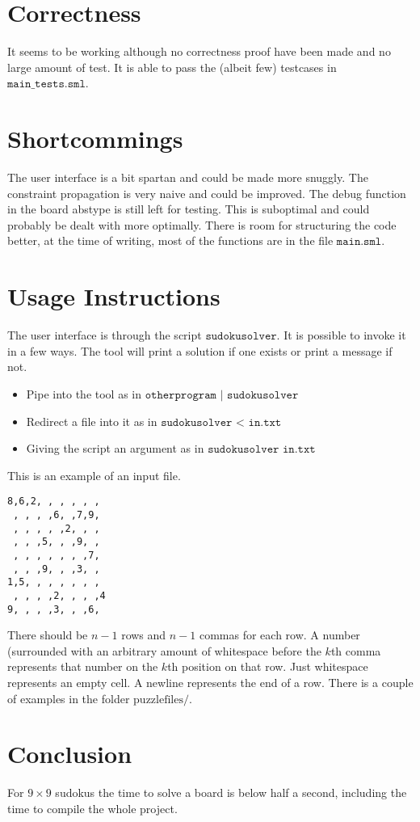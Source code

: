 \documentclass[12pt, a4paper]{article}
\begin{document}
\section{Correctness}

It seems to be working although no correctness proof have been made and no large amount of test. It is able to pass the (albeit few) testcases in $\texttt{main\_tests.sml}$.

\section{Shortcommings}

The user interface is a bit spartan and could be made more snuggly. The constraint propagation is very naive and could be improved. The debug function in the board abstype is still left for testing. This is suboptimal and could probably be dealt with more optimally. There is room for structuring the code better, at the time of writing, most of the functions are in the file $\texttt{main.sml}$.

\section{Usage Instructions}

The user interface is through the script $\texttt{sudokusolver}$. It is possible to invoke it in a few ways. The tool will print a solution if one exists or print a message if not.
\begin{itemize}
\item Pipe into the tool as in $\texttt{otherprogram | sudokusolver}$
\item Redirect a file into it as in $\texttt{sudokusolver < in.txt}$
\item Giving the script an argument as in $\texttt{sudokusolver in.txt}$
\end{itemize}
This is an example of an input file.
\begin{samepage}
\begin{verbatim}
8,6,2, , , , , ,
 , , , ,6, ,7,9,
 , , , , ,2, , ,
 , , ,5, , ,9, ,
 , , , , , , ,7,
 , , ,9, , ,3, ,
1,5, , , , , , ,
 , , , ,2, , , ,4
9, , , ,3, , ,6,
\end{verbatim}
  There should be $n-1$ rows and $n-1$ commas for each row.
  A number (surrounded with an arbitrary amount of whitespace before the $k$th comma represents that number on the $k$th position on that row. Just whitespace represents an empty cell. A newline represents the end of a row. There is a couple of examples in the folder $\text{puzzlefiles/}$.

\end{samepage}
\section{Conclusion}

For $9\times9$ sudokus the time to solve a board is below half a second, including the time to compile the whole project.
\end{document}
